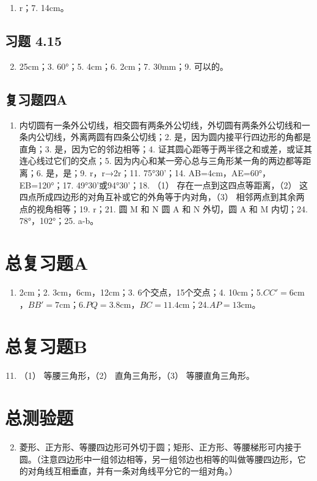 \begin{enumerate}
\item
  r；7. 14cm。
\end{enumerate}

\subsection{习题 4.15}

\begin{enumerate}
\setcounter{enumi}{1}
\item
  25cm；3. 60°；5. 4cm；6. 2cm；7. 30mm；9. 可以的。
\end{enumerate}

\subsection{复习题四A}

\begin{enumerate}
\item
  内切圆有一条外公切线，相交圆有两条外公切线，外切圆有两条外公切线和一条内公切线，外离两圆有四条公切线；2.
  是，因为圆内接平行四边形的角都是直角；3. 是，因为它的邻边相等；4.
  证其圆心距等于两半径之和或差，或证其连心线过它们的交点；5.
  因为内心和某一旁心总与三角形某一角的两边都等距离；6. 是，是；9.
  r，r→2r；11. 75°30'；14. AB=4cm，AE=60°，EB=120°；17.
  49°30'或94°30'；18. （1） 存在一点到这四点等距离，（2）
  这四点所成四边形的对角互补或它的外角等于内对角，（3）
  相邻两点到其余两点的视角相等；19. r；21. 圆 M 和 N 圆 A 和 N 外切，圆
  A 和 M 内切；24. 78°，102°；25. \textbar a-b\textbar。
\end{enumerate}

\section{总复习题A}

\begin{enumerate}
\item
  2cm；2. 3cm，6cm，12cm；3. 6个交点，15个交点；4.
  10cm；5.\(CC' = 6\mathrm{cm}\)，\(BB' = 7\mathrm{cm}\)；6.\(PQ = 3.8\mathrm{cm}\)，\(BC = 11.4\mathrm{cm}\)；24.\(AP = 13\mathrm{cm}\)。
\end{enumerate}

\section{总复习题B}

\begin{enumerate}
\setcounter{enumi}{10}
\item
  （1） 等腰三角形，（2） 直角三角形，（3） 等腰直角三角形。
\end{enumerate}

\section{总测验题}

\begin{enumerate}
\setcounter{enumi}{1}
\item
  菱形、正方形、等腰四边形可外切于圆；矩形、正方形、等腰梯形可内接于圆。（注意四边形中一组邻边相等，另一组邻边也相等的叫做等腰四边形，它的对角线互相垂直，并有一条对角线平分它的一组对角。）
\end{enumerate}
